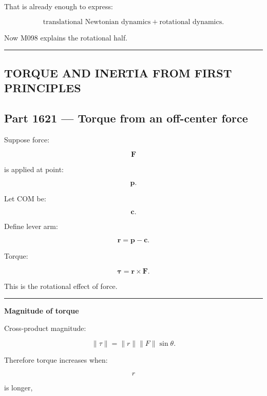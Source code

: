 That is already enough to express:

\[
\boxed{
\text{translational Newtonian dynamics}
+
\text{rotational dynamics}.
}
\]

Now M098 explains the rotational half.

\begin{center}\rule{0.5\linewidth}{0.5pt}\end{center}

\subsection{TORQUE AND INERTIA FROM FIRST PRINCIPLES}\label{06-engine-ii-ch035-torque-and-inertia-from-first-principles}

\hypertarget{06-engine-ii-ch035-torque-and-inertia-from-first-principles}{}

\subsection{Part 1621 --- Torque from an off-center force}\label{06-engine-ii-ch035-part-1621-torque-from-an-off-center-force}

\hypertarget{06-engine-ii-ch035-part-1621-torque-from-an-off-center-force}{}

Suppose force:

\[
\mathbf{F}
\]

is applied at point:

\[
\mathbf{p}.
\]

Let COM be:

\[
\mathbf{c}.
\]

Define lever arm:

\[
\boxed{
\mathbf{r}
=
\mathbf{p}-\mathbf{c}.
}
\]

Torque:

\[
\boxed{
\boldsymbol{\tau}
=
\mathbf{r}\times\mathbf{F}.
}
\]

This is the rotational effect of force.

\begin{center}\rule{0.5\linewidth}{0.5pt}\end{center}

\textbf{Magnitude of torque}

Cross-product magnitude:

\[
\|\tau\|
=
\|r\|\|F\|\sin\theta.
\]

Therefore torque increases when:

\[
r
\]

is longer,

